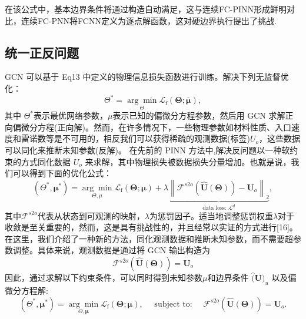 在该公式中，基本边界条件将通过构造自动满足，这与连续FC-PINN形成鲜明对比，连续FC-PNN将FCNN定义为逐点解函数，这对硬边界执行提出了挑战.

\subsection{统一正反问题}
GCN 可以基于 Eq13 中定义的物理信息损失函数进行训练。解决下列无监督优化：
$$\Theta^{*}=\underset{\Theta}{\arg \min } \mathcal{L}_{\mathrm{f}}(\boldsymbol{\Theta} ; \overline{\boldsymbol{\mu}}),$$
其中 $\Theta^{*}$表示最优网络参数，$\mu$表示已知的偏微分方程参数，然后用 GCN 求解正向偏微分方程(正向解)。然而，在许多情况下，一些物理参数如材料性质、入口速度和雷诺数等是不可用的，相反我们可以获得稀疏的观测数据(标签)$U_o$，这些数据可以同化来推断未知参数(反解)。
在先前的 PINN 方法中,解决反问题以一种软约束的方式同化数据 $U_o$ 来求解，其中物理损失被数据损失分量增加。也就是说，我们可以得到下面的优化公式：
$$\left(\Theta^{*}, \boldsymbol{\mu}^{*}\right)=\underset{\Theta, \mu}{\arg \min } \mathcal{L}_{\mathrm{f}}(\boldsymbol{\Theta} ; \boldsymbol{\mu})+\lambda \underbrace{\left\|\mathcal{F}^{s 2 o}(\hat{\boldsymbol{U}}(\boldsymbol{\Theta}))-\boldsymbol{U}_{o}\right\|_{2}}_{\text {data loss: } \mathcal{L}^{d}},$$
其中$\mathcal{F}^{s 2 o}$代表从状态到可观测的映射，$\lambda$为惩罚因子。适当地调整惩罚权重$\lambda$对于收敛是至关重要的，然而，这是具有挑战性的，并且经常以实证的方式进行[16]。
在这里，我们介绍了一种新的方法，同化观测数据和推断未知参数，而不需要超参数调整。具体来说，观测数据是通过将 GCN 输出构造为
$$\mathcal{F}^{s 2 o}(\hat{\boldsymbol{U}}(\boldsymbol{\Theta}))=\boldsymbol{U}_{o}$$
因此，通过求解以下约束条件，可以同时得到未知参数$\mu$和边界条件 $\hat(\boldsymbol{U})_u$ 以及偏微分方程解:
$$\left(\Theta^{*}, \boldsymbol{\mu}^{*}\right)=\underset{\Theta, \boldsymbol{\mu}}{\arg \min } \mathcal{L}_{\mathrm{f}}(\boldsymbol{\Theta} ; \boldsymbol{\mu}), \quad \text { subject to: } \quad \mathcal{F}^{s 2 o}(\hat{\boldsymbol{U}}(\boldsymbol{\Theta}))=\boldsymbol{U}_{o} .$$


